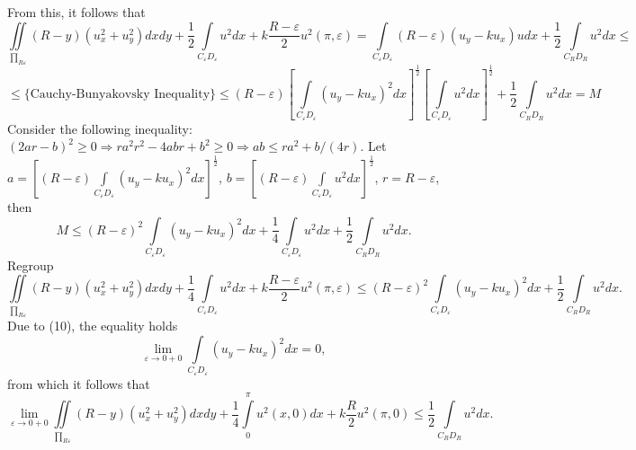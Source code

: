 \documentclass[9pt]{article}
\begin{document}
	From this, it follows that
	\begin{equation*}
		\iint\limits_{\prod_{R\varepsilon}} \left(R - y\right) \left(u_x^2 + u_y^2\right) dx dy + \dfrac{1}{2}\int\limits_{C_\varepsilon D_\varepsilon} u^2 dx +k\dfrac{R - \varepsilon}{2}u^2(\pi, \varepsilon)  =\int\limits_{C_\varepsilon D_\varepsilon} \left(R - \varepsilon \right) \left(u_y - ku_x\right)u dx + \dfrac12  \int\limits_{C_RD_R} u^2 dx \leq
	\end{equation*}
	\begin{equation*}
		\leq \{ \text{Cauchy-Bunyakovsky Inequality} \} \leq \left(R - \varepsilon\right) \left[\int\limits_{C_\varepsilon D_\varepsilon} \left( u_y - ku_x\right)^2 dx \right]^{\frac12} \left[\int\limits_{C_\varepsilon D_\varepsilon} u^2 dx \right]^{\frac12} + \dfrac12 \int\limits_{C_RD_R} u^2 dx = M
	\end{equation*}
	Consider the following inequality: $(2ar - b)^2 \geq 0 \Rightarrow ra^2r^2 - 4abr + b^2 \geq 0 \Rightarrow ab \leq ra^2 + b/ (4r)$. Let $a =  \left[\left(R - \varepsilon\right)\int\limits_{C_\varepsilon D_\varepsilon} \left( u_y - ku_x\right)^2 dx \right]^{\frac12}$, $b = \left[\left(R - \varepsilon\right)\int\limits_{C_\varepsilon D_\varepsilon} u^2 dx \right]^{\frac12}$, $r = R - \varepsilon$, then
	\begin{equation*}
		M \leq \left(R - \varepsilon\right)^2 \int\limits_{C_\varepsilon D_\varepsilon} \left( u_y - ku_x\right)^2 dx + \dfrac14 \int\limits_{C_\varepsilon D_\varepsilon} u^2 dx + \dfrac12 \int\limits_{C_RD_R} u^2 dx.
	\end{equation*}
	Regroup
	\begin{equation*}
		\iint\limits_{\prod_{R\varepsilon}} \left(R - y\right) \left(u_x^2 + u_y^2\right) dx dy + \dfrac{1}{4}\int\limits_{C_\varepsilon D_\varepsilon} u^2 dx +k\dfrac{R - \varepsilon}{2}u^2(\pi, \varepsilon) \leq \left(R - \varepsilon\right)^2 \int\limits_{C_\varepsilon D_\varepsilon} \left( u_y - ku_x\right)^2 dx + \dfrac12 \int\limits_{C_RD_R} u^2 dx.
	\end{equation*}
	Due to (10), the equality holds
	\begin{equation*}
		\lim\limits_{\varepsilon \to 0 + 0} \int\limits_{C_\varepsilon D_\varepsilon} \left(u_y - ku_x\right)^2 dx = 0,
	\end{equation*}
	from which it follows that
	\begin{equation*}
		\lim\limits_{\varepsilon \to 0 + 0} \iint\limits_{\prod_{R\varepsilon}} \left(R - y\right) \left(u_x^2 + u_y^2 \right) dx dy + \dfrac14 \int\limits_0^\pi u^2(x,0) dx + k\dfrac{R}{2}u^2(\pi,0) \leq \dfrac12 \int\limits_{C_RD_R} u^2 dx.
	\end{equation*}
\end{document}
